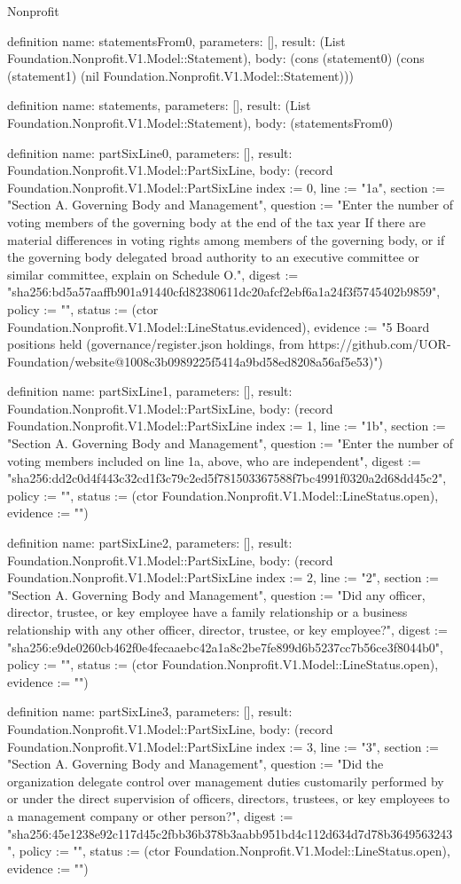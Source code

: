 \begin{lexlean}{Nonprofit}
\begin{semanticmodule}
definition{
  name: statementsFrom0,
  parameters: [],
  result: (List Foundation.Nonprofit.V1.Model::Statement),
  body: (cons (statement0) (cons (statement1) (nil Foundation.Nonprofit.V1.Model::Statement)))
}

definition{
  name: statements,
  parameters: [],
  result: (List Foundation.Nonprofit.V1.Model::Statement),
  body: (statementsFrom0)
}

definition{
  name: partSixLine0,
  parameters: [],
  result: Foundation.Nonprofit.V1.Model::PartSixLine,
  body: (record Foundation.Nonprofit.V1.Model::PartSixLine {index := 0, line := "1a", section := "Section A. Governing Body and Management", question := "Enter the number of voting members of the governing body at the end of the tax year If there are material differences in voting rights among members of the governing body, or if the governing body delegated broad authority to an executive committee or similar committee, explain on Schedule O.", digest := "sha256:bd5a57aaffb901a91440cfd82380611dc20afcf2ebf6a1a24f3f5745402b9859", policy := "", status := (ctor Foundation.Nonprofit.V1.Model::LineStatus.evidenced), evidence := "5 Board positions held (governance/register.json holdings, from https://github.com/UOR-Foundation/website@1008c3b0989225f5414a9bd58ed8208a56af5e53)"})
}

definition{
  name: partSixLine1,
  parameters: [],
  result: Foundation.Nonprofit.V1.Model::PartSixLine,
  body: (record Foundation.Nonprofit.V1.Model::PartSixLine {index := 1, line := "1b", section := "Section A. Governing Body and Management", question := "Enter the number of voting members included on line 1a, above, who are independent", digest := "sha256:dd2c0d4f443c32cd1f3c79c2ed5f781503367588f7bc4991f0320a2d68dd45c2", policy := "", status := (ctor Foundation.Nonprofit.V1.Model::LineStatus.open), evidence := ""})
}

definition{
  name: partSixLine2,
  parameters: [],
  result: Foundation.Nonprofit.V1.Model::PartSixLine,
  body: (record Foundation.Nonprofit.V1.Model::PartSixLine {index := 2, line := "2", section := "Section A. Governing Body and Management", question := "Did any officer, director, trustee, or key employee have a family relationship or a business relationship with any other officer, director, trustee, or key employee?", digest := "sha256:e9de0260cb462f0e4fecaaebc42a1a8c2be7fe899d6b5237cc7b56ce3f8044b0", policy := "", status := (ctor Foundation.Nonprofit.V1.Model::LineStatus.open), evidence := ""})
}

definition{
  name: partSixLine3,
  parameters: [],
  result: Foundation.Nonprofit.V1.Model::PartSixLine,
  body: (record Foundation.Nonprofit.V1.Model::PartSixLine {index := 3, line := "3", section := "Section A. Governing Body and Management", question := "Did the organization delegate control over management duties customarily performed by or under the direct supervision of officers, directors, trustees, or key employees to a management company or other person?", digest := "sha256:45e1238e92c117d45c2fbb36b378b3aabb951bd4c112d634d7d78b3649563243", policy := "", status := (ctor Foundation.Nonprofit.V1.Model::LineStatus.open), evidence := ""})
}


\end{semanticmodule}
\end{lexlean}
